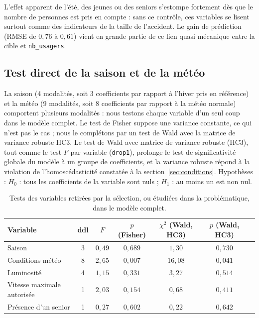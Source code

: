 \documentclass[11pt,a4paper]{article}
\begin{document}
L'effet apparent de l'été, des jeunes ou des seniors s'estompe fortement dès que le nombre de personnes est pris en compte : sans ce contrôle, ces variables se lisent surtout comme des indicateurs de la taille de l'accident. Le gain de prédiction (RMSE de $0{,}76$ à $0{,}61$) vient en grande partie de ce lien quasi mécanique entre la cible et \texttt{nb\_usagers}.

\subsection{Test direct de la saison et de la météo}\label{sec:test_direct}
La saison (4 modalités, soit 3 coefficients par rapport à l'hiver pris en référence) et la météo (9 modalités, soit 8 coefficients par rapport à la météo normale) comportent plusieurs modalités : nous testons chaque variable d'un seul coup dans le modèle complet. Le test de Fisher suppose une variance constante, ce qui n'est pas le cas ; nous le complétons par un test de Wald avec la matrice de variance robuste HC3. Le test de Wald avec matrice de variance robuste (HC3), tout comme le test $F$ par variable (\texttt{drop1}), prolonge le test de significativité globale du modèle à un groupe de coefficients, et la variance robuste répond à la violation de l'homoscédasticité constatée à la section~\ref{sec:conditions}. Hypothèses : $H_0$ : tous les coefficients de la variable sont nuls ; $H_1$ : au moins un est non nul.

\begin{table}[H]
\centering
\small
\begin{tabular}{lcccccc}
\toprule
\textbf{Variable} & \textbf{ddl} & \textbf{$F$} & \textbf{$p$ (Fisher)} & \textbf{$\chi^2$ (Wald, HC3)} & \textbf{$p$ (Wald, HC3)} \\
\midrule
Saison                       & 3 & $0{,}49$ & $0{,}689$ & $1{,}30$  & $0{,}730$ \\
Conditions météo             & 8 & $2{,}65$ & $0{,}007$ & $16{,}08$ & $0{,}041$ \\
Luminosité                   & 4 & $1{,}15$ & $0{,}331$ & $3{,}27$  & $0{,}514$ \\
Vitesse maximale autorisée   & 1 & $2{,}03$ & $0{,}154$ & $0{,}68$  & $0{,}411$ \\
Présence d'un senior         & 1 & $0{,}27$ & $0{,}602$ & $0{,}22$  & $0{,}642$ \\
\bottomrule
\end{tabular}
\caption{Tests des variables retirées par la sélection, ou étudiées dans la problématique, dans le modèle complet.}
\label{tab:drop1}
\end{table}
\end{document}
